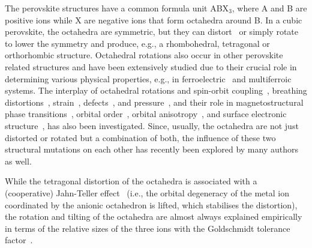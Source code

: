 \documentclass[a4paper,prb,twocolumn]{revtex4-1}  %
\begin{document}
The perovskite structures
have a common formula unit ABX$_3$,
where 
A and B are positive ions while X are negative ions 
that form octahedra around  B.
In a cubic perovskite,
the octahedra are symmetric, 
but they can 
distort~\cite{
BersukerCCR75,
KugelSPU82,
MillisN98,
TerakuraPMS07,
HalcrowRSC13,
LufasoAC04}
or simply 
rotate~\cite{
GlazerAC72, ThomasAC96,
WoodwardAC97a,WoodwardAC97b,
HowardAC98,StokesAC02,AngelPRL05}
 to lower the symmetry
and produce, e.g., a rhombohedral, tetragonal or orthorhombic structure.
Octahedral rotations also occur in other perovskite related structures
and
have been extensively 
studied
due to their crucial role in determining various physical properties,
e.g., in 
ferroelectric~\cite{GhosezNM11,
RondinelliAM12,
SchickPRB14,
SimPRB14,
LeePRL17,
WangPRL22,
ZhouPRB22,
GaoPRB23} and 
multiferroic~\cite{KhomskiiPhys09,
BenedekPRL11,
YangPRL14,
YePRB18,
ZhangPRL20,
ZhangYajunPRL20, 
ZhouPRB21,
ZhangPRL22}
systems.
The interplay of octahedral rotations
and 
spin-orbit coupling~\cite{AmatNL14,KrachJPCM23},
breathing distortions~\cite{BalachandranPRB13},
strain~\cite{Aguado-PuentePRL11},
defects~\cite{JiaPRB22}, and
pressure~\cite{XiangPRB17},
and 
their role in
magnetostructural phase transitions~\cite{JohnsonPRL20},
orbital order~\cite{OgawaPRL12,ChenPRL19}, orbital anisotropy~\cite{HuangPRB21}, 
and
surface electronic structure~\cite{MoralesPRL23},
has also been investigated.
Since, usually, the octahedra are not just %
distorted or rotated but a combination of both,
the influence of these two 
structural mutations %
on each other has recently been explored by many authors~\cite{LufasoAC04,CarpenterAC09,ChenPRL19}
as well.



While the tetragonal distortion of the octahedra is associated with
a (cooperative) Jahn-Teller 
effect~\cite{JahnPRSL37,JahnPRSL38,
OpikRS57,
Sturge68,
GehringRPP75,
BersukerCCR75,
KugelSPU82,
MillisN98,
LufasoAC04,
TerakuraPMS07,
HalcrowRSC13,
PavariniChap,
KhomskiiCR21}
(i.e., the orbital degeneracy of the metal ion coordinated by the anionic octahedron
is lifted, which stabilises the distortion),
the rotation and tilting of the octahedra are almost always 
explained empirically in terms of 
the relative sizes of the three ions
with the
Goldschmidt tolerance factor~\cite{Goldschmidt1926,KieslichCS15}. 
\end{document}
